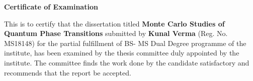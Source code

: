 \documentclass[a4paper,12pt]{report}
\numberwithin{equation}{section}
\begin{document}

  




\begin{center}
    \textsf{\textbf{\Large Certificate of Examination}} 
\end{center}
\vspace*{1em}

This is to certify that the dissertation titled \textbf{Monte Carlo Studies of Quantum Phase Transitions} submitted by \textbf{Kunal Verma} (Reg. No. MS18148) for the partial fulfillment of BS- MS Dual Degree programme of the institute, has been examined by the thesis committee duly appointed by the institute. The committee finds the work done by the candidate satisfactory and recommends that the report be accepted.

\vspace{4cm}
\end{document}
